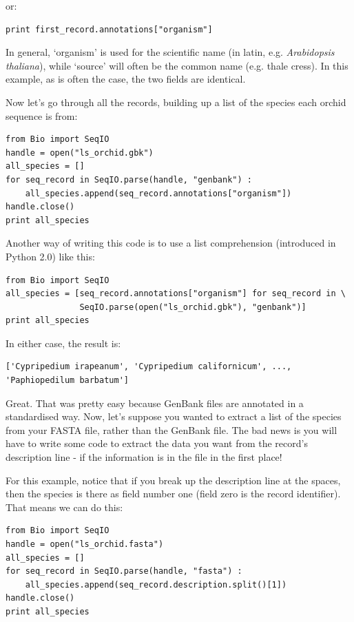 \documentclass{report}
\begin{document}
\noindent or:

\begin{verbatim}
print first_record.annotations["organism"]
\end{verbatim}

In general, `organism' is used for the scientific name (in latin, e.g. \textit{Arabidopsis thaliana}),
while `source' will often be the common name (e.g. thale cress).  In this example, as is often the case,
the two fields are identical.  

Now let's go through all the records, building up a list of the species each orchid sequence is from:

\begin{verbatim}
from Bio import SeqIO
handle = open("ls_orchid.gbk")
all_species = []
for seq_record in SeqIO.parse(handle, "genbank") :
    all_species.append(seq_record.annotations["organism"])
handle.close()
print all_species
\end{verbatim}

Another way of writing this code is to use a list comprehension (introduced in Python 2.0) like this:

\begin{verbatim}
from Bio import SeqIO
all_species = [seq_record.annotations["organism"] for seq_record in \
               SeqIO.parse(open("ls_orchid.gbk"), "genbank")]
print all_species
\end{verbatim}

\noindent In either case, the result is:

\begin{verbatim}
['Cypripedium irapeanum', 'Cypripedium californicum', ..., 'Paphiopedilum barbatum']
\end{verbatim}

Great.  That was pretty easy because GenBank files are annotated in a standardised way.  Now, let's suppose you wanted to extract a list of the species from your FASTA file, rather than the GenBank file.  The bad news is you will have to write some code to extract the data you want from the record's description line - if the information is in the file in the first place!

For this example, notice that if you break up the description line at the spaces, then the species is there as field number one (field zero is the record identifier).  That means we can do this:

\begin{verbatim}
from Bio import SeqIO
handle = open("ls_orchid.fasta")
all_species = []
for seq_record in SeqIO.parse(handle, "fasta") :
    all_species.append(seq_record.description.split()[1])
handle.close()
print all_species
\end{verbatim}
\end{document}
